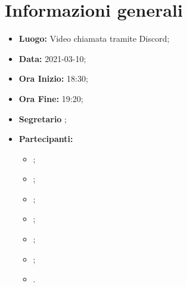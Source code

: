\section{Informazioni generali}
	\begin{itemize}
		\item \textbf{Luogo:} Video chiamata tramite Discord;
		\item \textbf{Data:} 2021-03-10;
		\item \textbf{Ora Inizio:} 18:30;
		\item \textbf{Ora Fine:} 19:20;
		\item \textbf{Segretario} \FD;
		\item \textbf{Partecipanti:}
		\begin{itemize}
			\item \MB;
			\item \VAS;
			\item \FD;
			\item \NM;
			\item \SB;
			\item \GB;
			\item \MDI.
		\end{itemize}
		
	\end{itemize}